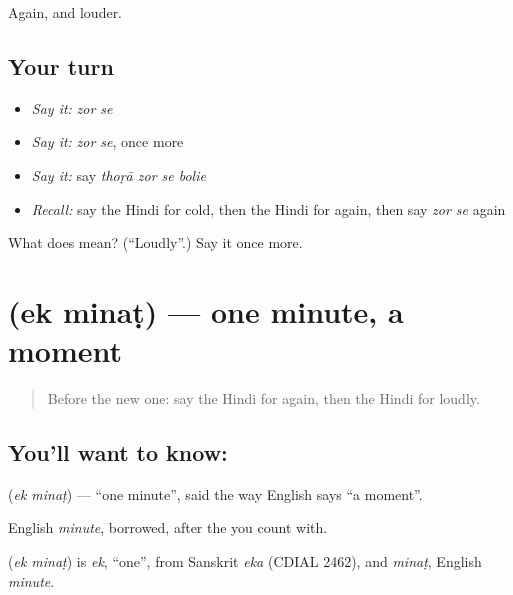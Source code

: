 \begin{grammarlens}[title={What you've built}]
Again, and louder.
\end{grammarlens}

\subsection*{Your turn}
\begin{itemize}
\raggedright
  \item \emph{Say it:} \emph{zor se}
  \item \emph{Say it:} \emph{zor se}, once more
  \item \emph{Say it:} say \emph{thoṛā zor se bolie}
  \item \emph{Recall:} say the Hindi for cold, then the Hindi for again, then say \emph{zor se} again
\end{itemize}

\begin{tcolorbox}[breakable,colback=teal!4,colframe=teal!35!black,title={Before you move on}]
What does   mean? (\textquotedblleft{}Loudly\textquotedblright{}.) Say it once more.
\end{tcolorbox}
\section[\texorpdfstring{\hi{एक} \hi{मिनट} (ek minaṭ)}{एक मिनट (ek minaṭ)}]{  (ek minaṭ) — one minute, a moment}

\label{lesson:HI-C110-ekminat}



\begin{quote}
Before the new one: say the Hindi for again, then the Hindi for loudly.
\end{quote}

\subsection*{You'll want to know:  }
\textbf{ } (\emph{ek minaṭ}) — \textquotedblleft{}one minute\textquotedblright{}, said the way English says \textquotedblleft{}a moment\textquotedblright{}.

English \emph{minute}, borrowed, after the \textbf{} you count with.

\begin{cousinweb}
\textbf{ } (\emph{ek minaṭ}) is \emph{ek}, \textquotedblleft{}one\textquotedblright{}, from Sanskrit \emph{eka} (CDIAL 2462), and \emph{minaṭ}, English \emph{minute}.
\end{cousinweb}

